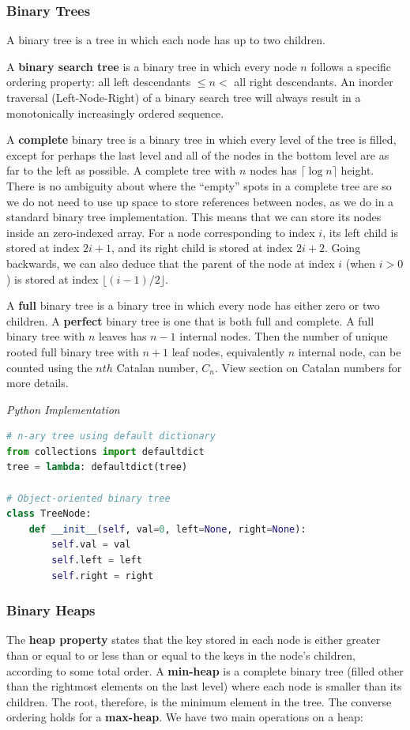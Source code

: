\documentclass{article}
\begin{document}
    \subsubsection{Binary Trees}
    A binary tree is a tree in which each node has up to two children. 
    
    A \textbf{binary search tree} is a binary tree in which every node $n$ follows a specific ordering property: all left descendants $\leq n <$ all right descendants. An inorder traversal (Left-Node-Right) of a binary search tree will always result in a monotonically increasingly ordered sequence.
    
    A \textbf{complete} binary tree is a binary tree in which every level of the tree is filled, except for perhaps the last level and all of the nodes in the bottom level are as far to the left as possible. A complete tree with $n$ nodes has $\lceil \log n \rceil$ height. There is no ambiguity about where the ``empty'' spots in a complete tree are so we do not need to use up space to store references between nodes, as we do in a standard binary tree implementation. This means that we can store its nodes inside an zero-indexed array. For a node corresponding to index $i$, its left child is stored at index $2i + 1$, and its right child is stored at index $2i + 2$. Going backwards, we can also deduce that the parent of the node at index $i$ (when $i > 0$) is stored at index $\lfloor (i-1)/2 \rfloor$.
    
    A \textbf{full} binary tree is a binary tree in which every node has either zero or two children. A \textbf{perfect} binary tree is one that is both full and complete. A full binary tree with $n$ leaves has $n - 1$ internal nodes. Then the number of unique rooted full binary tree with $n + 1$ leaf nodes, equivalently $n$ internal node, can be counted using the $nth$ Catalan number, $C_n$. View section on Catalan numbers for more details.

\vspace{8pt} \emph{Python Implementation}
\begin{lstlisting}[language=Python]
# n-ary tree using default dictionary
from collections import defaultdict
tree = lambda: defaultdict(tree)

# Object-oriented binary tree
class TreeNode:
    def __init__(self, val=0, left=None, right=None):
        self.val = val
        self.left = left
        self.right = right
\end{lstlisting}
    
    \subsubsection{Binary Heaps}
    The \textbf{heap property} states that the key stored in each node is either greater than or equal to or less than or equal to the keys in the node's children, according to some total order. A \textbf{min-heap} is a complete binary tree (filled other than the rightmost elements on the last level) where each node is smaller than its children. The root, therefore, is the minimum element in the tree. The converse ordering holds for a \textbf{max-heap}. We have two main operations on a heap: 
    
\end{document}
